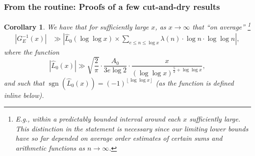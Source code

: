 \documentclass[11pt,reqno,a4letter]{article}
\numberwithin{figure}{section}
\numberwithin{table}{section}
\newcommand{\floor}[1]{\left\lfloor #1 \right\rfloor}
\theoremstyle{plain}
\newtheorem{cor}[theorem]{Corollary}
\numberwithin{theorem}{section}
\theoremstyle{definition}
\newcommand{\NBRef}[1]{}
\newcommand{\SuccSim}[0]{\overset{_{\scriptsize{\blacktriangle}}}{\succsim}}
\renewcommand{\SuccSim}[0]{\ensuremath{\gg}}
\begin{document}
\subsubsection{From the routine: Proofs of a few cut-and-dry results} 
\label{subsubSection_RoutineProofsNeededForMainBoundOnGInvxFunc} 

\begin{cor} 
\label{cor_ASemiForm_ForGInvx_v1} 
We have that for sufficiently large $x$, as $x \rightarrow \infty$ that 
``on average'' \footnote{ 
     E.g., within a predictably bounded interval around each $x$ sufficiently large. 
     This distinction in the statement is necessary since our limiting lower bounds have 
     so far depended on average order estimates of certain sums and arithmetic functions 
     as $n \rightarrow \infty$. 
} 
\begin{align*} 
\left\lvert G_E^{-1}(x) \right\rvert & \SuccSim 
     \left\lvert 
     \widehat{L}_0\left(\log\log x\right) \times \sum_{e \leq n \leq \log x} 
     \lambda(n) \cdot \log n \cdot \log\log n \right\rvert, 
\end{align*} 
where the function 
\[
\left\lvert \widehat{L}_0(x) \right\rvert \SuccSim 
     \sqrt{\frac{2}{\pi}} \cdot \frac{A_0}{3e \log 2} \cdot 
     \frac{x}{(\log\log x)^{\frac{5}{2} + \log\log x}}, 
\]
and such that $\operatorname{sgn}(\widehat{L}_0(x)) = (-1)^{\floor{\log\log x}}$ 
(as the function is defined inline below). 
\end{cor} 
\NBRef{A10-2020.04-26} 
\end{document}
